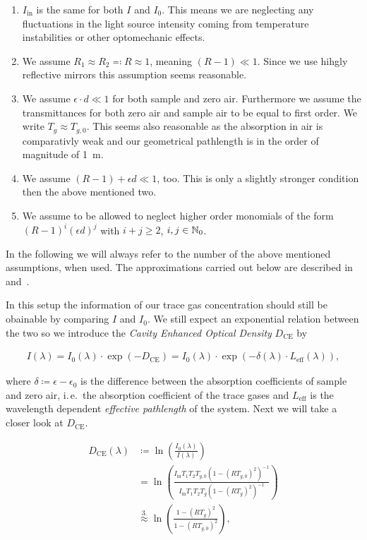 \begin{enumerate}
\item $I_{\text{in}}$ is the same for both $I$ and $I_0$. This means
  we are neglecting any fluctuations in the light source intensity
  coming from temperature instabilities or other optomechanic effects.
\item We assume $R_1 \approx R_2 \eqqcolon R \approx 1$, meaning $(R -
  1) \ll 1$. Since we use hihgly reflective mirrors this assumption
  seems reasonable.
\item We assume $\epsilon \cdot d \ll 1$ for both sample and zero
  air. Furthermore we assume the transmittances for both zero air and
  sample air to be equal to first order. We write $T_g \approx
  T_{g,0}$. This seems also reasonable as the absorption in air is
  comparativly weak and our geometrical pathlength is in the order of
  magnitude of \SI{1}{\meter}.
\item We assume  $(R - 1) + \epsilon d \ll 1$, too. This is only a
  slightly stronger condition then the above mentioned two.
\item We assume to be allowed to neglect higher order monomials of the
  form $(R-1)^i(\epsilon d)^j$  with $i+j \geq 2$, $i,j \in \mathbb{N}_0$.
\end{enumerate}

In the following we will always refer to the number of the above
mentioned assumptions, when used. The approximations carried out below
are described in~\cite{platt2009} and~\cite{fiedler2003}.

In this setup the information of our trace gas concentration should
still be obainable by comparing $I$ and $I_0$. We still expect an
exponential relation between the two so we introduce the \emph{Cavity
  Enhanced Optical Density} $D_{\text{CE}}$ by

\begin{align}
  I(\lambda) = I_0(\lambda) \cdot \exp(- D_{\text{CE}}) = I_0(\lambda)
  \cdot \exp(-\delta(\lambda) \cdot L_{\text{eff}}(\lambda)),
\end{align}

where $\delta \coloneqq \epsilon - \epsilon_0$ is the difference
between the absorption coefficients of sample and zero air, i.\,e.\ the
absorption coefficient of the trace gases and $L_{\text{eff}}$ is the
wavelength dependent \emph{effective pathlength} of the system. Next
we will take a closer look at $D_{\text{CE}}$.

\begin{align}
  D_{\text{CE}}(\lambda) & \coloneqq \ln\left(
                           \frac{I_0(\lambda)}{I(\lambda)}\right)\nonumber\\
                         & = \ln\left ( \frac{I_{\text{in}}T_1T_2T_{g,0}(1 -
                           (RT_{g,0})^2)^{-1}}{I_{\text{in}}T_1T_2T_g(1 -
                           (RT_g)^2)^{-1}}\right)\nonumber\\
                         & \stackrel{3.}{\approx} \ln\left( \frac{1 -
                           (RT_g)^2}{1 - (RT_{g,0})^2}\right)\label{eq:d_ce},
\end{align}

